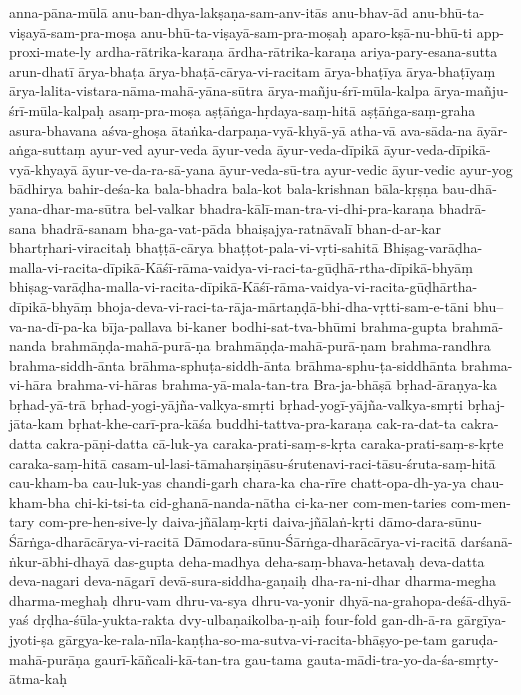 {anna-pāna-mūlā
anu-ban-dhya-lakṣaṇa-sam-anv-itās
anu-bhav-ād
anu-bhū-ta-viṣayā-sam-pra-moṣa
anu-bhū-ta-viṣayā-sam-pra-moṣaḥ
aparo-kṣā-nu-bhū-ti
app-proxi-mate-ly
ardha-rātrika-karaṇa
ārdha-rātrika-karaṇa
ariya-pary-esana-sutta
arun-dhatī
ārya-bhaṭa
ārya-bhaṭā-cārya-vi-racitam
ārya-bhaṭīya
ārya-bhaṭīyaṃ
ārya-lalita-vistara-nāma-mahā-yāna-sūtra
ārya-mañju-śrī-mūla-kalpa
ārya-mañju-śrī-mūla-kalpaḥ
asaṃ-pra-moṣa
aṣṭāṅga-hṛdaya-saṃ-hitā
aṣṭāṅga-saṃ-graha
asura-bhavana
aśva-ghoṣa
ātaṅka-darpaṇa-vyā-khyā-yā
atha-vā
ava-sāda-na
āyār-aṅga-suttaṃ
ayur-ved
ayur-veda
āyur-veda
āyur-veda-dīpikā
āyur-veda-dīpikā-vyā-khyayā
āyur-ve-da-ra-sā-yana
āyur-veda-sū-tra
ayur-vedic
āyur-vedic
ayur-yog
bādhirya
bahir-deśa-ka
bala-bhadra
bala-kot
bala-krishnan
bāla-kṛṣṇa
bau-dhā-yana-dhar-ma-sūtra
bel-valkar
bhadra-kālī-man-tra-vi-dhi-pra-karaṇa
bhadrā-sana
bhadrā-sanam
bha-ga-vat-pāda
bhaiṣajya-ratnāvalī
bhan-d-ar-kar
bhartṛhari-viracitaḥ
bhaṭṭā-cārya
bhaṭṭot-pala-vi-vṛti-sahitā
Bhiṣag-varāḍha-malla-vi-racita-dīpikā-Kāśī-rāma-vaidya-vi-raci-ta-gūḍhā-rtha-dīpikā-bhyāṃ
bhiṣag-varāḍha-malla-vi-racita-dīpikā-Kāśī-rāma-vaidya-vi-racita-gūḍhārtha-dīpikā-bhyāṃ
bhoja-deva-vi-raci-ta-rāja-mārtaṇḍā-bhi-dha-vṛtti-sam-e-tāni
bhu--va-na-dī-pa-ka
bīja-pallava
bi-kaner
bodhi-sat-tva-bhūmi
brahma-gupta
brahmā-nanda
brahmāṇḍa-mahā-purā-ṇa
brahmāṇḍa-mahā-purā-ṇam
brahma-randhra
brahma-siddh-ānta
brāhma-sphuṭa-siddh-ānta
brāhma-sphu-ṭa-siddhānta
brahma-vi-hāra
brahma-vi-hāras
brahma-yā-mala-tan-tra
Bra-ja-bhāṣā
bṛhad-āraṇya-ka
bṛhad-yā-trā
bṛhad-yogi-yājña-valkya-smṛti
bṛhad-yogī-yājña-valkya-smṛti
bṛhaj-jāta-kam
bṛhat-khe-carī-pra-kāśa
buddhi-tattva-pra-karaṇa
cak-ra-dat-ta
cakra-datta
cakra-pāṇi-datta
cā-luk-ya
caraka-prati-saṃ-s-kṛta
caraka-prati-saṃ-s-kṛte
caraka-saṃ-hitā
casam-ul-lasi-tāmaharṣiṇāsu-śrutenavi-raci-tāsu-śruta-saṃ-hitā
cau-kham-ba
cau-luk-yas
chandi-garh
chara-ka
cha-rīre
chatt-opa-dh-ya-ya
chau-kham-bha
chi-ki-tsi-ta
cid-ghanā-nanda-nātha
ci-ka-ner
com-men-taries
com-men-tary
com-pre-hen-sive-ly
daiva-jñālaṃ-kṛti
daiva-jñālaṅ-kṛti
dāmo-dara-sūnu-Śārṅga-dharācārya-vi-racitā
Dāmodara-sūnu-Śārṅga-dharācārya-vi-racitā
darśanā-ṅkur-ābhi-dhayā
das-gupta
deha-madhya
deha-saṃ-bhava-hetavaḥ
deva-datta
deva-nagari
deva-nāgarī
devā-sura-siddha-gaṇaiḥ
dha-ra-ni-dhar
dharma-megha
dharma-meghaḥ
dhru-vam
dhru-va-sya
dhru-va-yonir
dhyā-na-grahopa-deśā-dhyā-yaś
dṛḍha-śūla-yukta-rakta
dvy-ulbaṇaikolba-ṇ-aiḥ
four-fold
gan-dh-ā-ra
gārgīya-jyoti-ṣa
gārgya-ke-rala-nīla-kaṇṭha-so-ma-sutva-vi-racita-bhāṣyo-pe-tam
garuḍa-mahā-purāṇa
gaurī-kāñcali-kā-tan-tra
gau-tama
gauta-mādi-tra-yo-da-śa-smṛty-ātma-kaḥ
}
